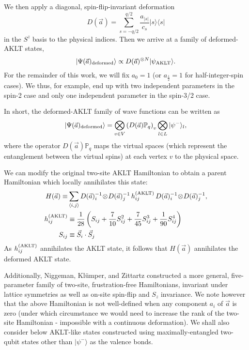 \documentclass[aps,prb,letterpaper,superscriptaddress,twocolumn,showpacs,floatfix,10pt]{revtex4-1}
\begin{document}
We then apply a diagonal, spin-flip-invariant deformation
\begin{equation}
D(\vec{a})=\sum_{s=-q/2} ^{q/2} \frac{a_{|s|}}{c_s} |s \rangle \langle s|
\label{eqn:deformation-definition}
\end{equation}
in the $S^z$ basis to the physical indices. Then we arrive at a family
of deformed-AKLT states,
\begin{align}
|\Psi(\vec{a})_{\rm deformed} \rangle \propto D(\vec{a})^{ \otimes N}  |\psi_\text{AKLT} \rangle. 
\end{align} 
For the remainder of this work, we will fix $a_0 = 1$ (or $a_{\frac{1}{2}}=1$
for half-integer-spin cases).
We thus, for example, end up with two independent parameters in
the spin-2 case and only one independent parameter in the spin-3/2 case.

In short, the deformed-AKLT family of wave functions can be written as 
\begin{align}
\label{eqn:deformed}
|\Psi(\vec{a})_{\rm deformed} \rangle = \bigotimes_{v\in V} \left( D(\vec{a})\mathbb{P}_q  \right)_{v} \bigotimes_{l\in L} | \psi^- \rangle_{l}, 
\end{align} 
where the operator
$D(\vec{a}) \mathbb{P}_q$ maps the virtual spaces (which represent the
entanglement between the virtual spins) at each vertex $v$ to the
physical space.

We can modify the original two-site AKLT Hamiltonian\cite{AKLTgap} to obtain a
parent Hamiltonian which locally annihilates this state:
\begin{align}
\label{eqn:Ha}
H(\vec{a})\equiv &\sum_{\langle i,j\rangle} D(\vec{a})^{-1}_i \!\otimes\! D(\vec{a})^{-1}_j \, h_{ij}^{(\rm AKLT)} \, D(\vec{a})^{-1}_i \!\otimes\! D(\vec{a})^{-1}_j,\\
h_{ij}^{(\rm AKLT)} &\equiv \frac{1}{28}\left(S_{ij} + \frac{7}{10}S_{ij}^2+\frac{7}{45}S_{ij}^3+\frac{1}{90}S_{ij}^4\right)\notag\\
S_{ij} &\equiv \vec{S}_i\cdot\vec{S}_j\notag
\end{align}
As $h_{ij}^{(\rm AKLT)}$ annihilates the AKLT state, it follows
that $H(\vec{a})$ annihilates the deformed AKLT state.

Additionally, Niggeman, Kl\"umper, and Zittartz constructed
a more general, five-parameter family of two-site, frustration-free
Hamiltonians, invariant under lattice symmetries as well as on-site spin-flip
and $S_z$ invariance.
We note however that the above Hamiltonian is not well-defined when any
component $a_i$ of $\vec{a}$ is zero (under which circumstance we
would need to increase the rank of the two-site Hamiltonian - impossible with a
continuous deformation).
We shall also consider below AKLT-like states constructed using
maximally-entangled two-qubit states other than $|\psi^-\rangle$  as the valence bonds.
\end{document}
